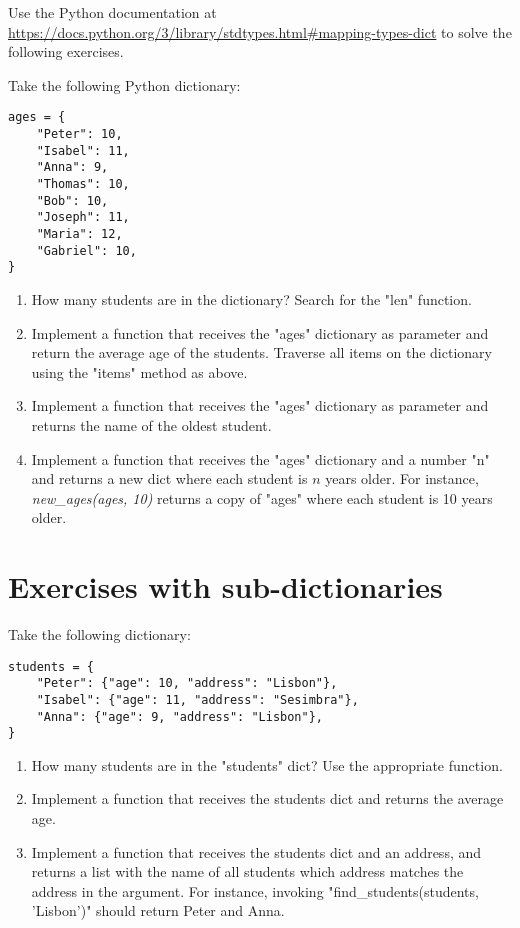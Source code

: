 Use the Python documentation at \url{https://docs.python.org/3/library/stdtypes.html#mapping-types-dict} to solve the following exercises.

Take the following Python dictionary:

\begin{verbatim}
ages = {
    "Peter": 10,
    "Isabel": 11,
    "Anna": 9,
    "Thomas": 10,
    "Bob": 10,
    "Joseph": 11,
    "Maria": 12,
    "Gabriel": 10,
}
\end{verbatim}

\begin{enumerate}

\item How many students are in the dictionary? Search for the "len" function.

\item Implement a function that receives the "ages" dictionary as parameter and return the average age of the students. Traverse all items on the dictionary using the "items" method as above.

\item Implement a function that receives the "ages" dictionary as parameter and returns the name of the oldest student.

\item Implement a function that receives the "ages" dictionary and a number "n" and returns a new dict where each student is $n$ years older. For instance, \textit{new\_ages(ages, 10)} returns a copy of "ages" where each student is 10 years older.

\end{enumerate}

\section{Exercises with sub-dictionaries}

Take the following dictionary:

\begin{verbatim}
students = {
    "Peter": {"age": 10, "address": "Lisbon"},
    "Isabel": {"age": 11, "address": "Sesimbra"},
    "Anna": {"age": 9, "address": "Lisbon"},
}
\end{verbatim}

\begin{enumerate}

\item How many students are in the "students" dict? Use the appropriate function.

\item Implement a function that receives the students dict and returns the average age.

\item Implement a function that receives the students dict and an address, and returns a list with the name of all students which address matches the address in the argument. For instance, invoking "find\_students(students, 'Lisbon')" should return Peter and Anna.

\end{enumerate}
